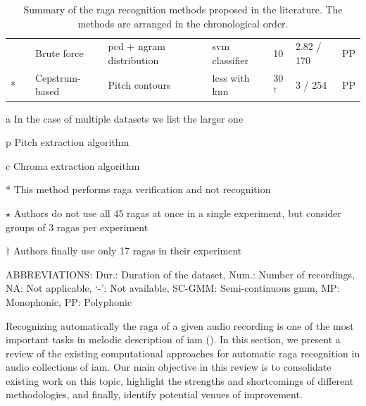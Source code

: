 \begin{table}
\begin{threeparttable}
\begin{centering}
\begin{tabular}{l l P{2cm} P{3cm} P{2.5cm} L{1cm} P{1.5cm} P{.75cm}}
				\cite{kumar2014identifying} & \cite{Salamon2012} & Brute force & \acrshort{pcd} + \acrshort{ngram} distribution & \acrshort{svm} classifier  & 10 & 2.82 / 170 & PP\tabularnewline
				\cite{shrey_ISMIR_2015}{*} & \cite{Salamon2012} & Cepstrum-based & Pitch contours & \acrshort{lcss} with \acrshort{knn} & 30{$^\dagger$} & 3 / 254 & PP\tabularnewline
				\hline 
			\end{tabular}
			\par \end{centering}
		\begin{tablenotes}
			\item[a] In the case of multiple datasets we list the larger one
			\item[p] Pitch extraction algorithm
			\item[c] Chroma extraction algorithm
			\item[*] This method performs \gls{raga} verification and not recognition
			\item[$\star$] Authors do not use all 45 \glspl{raga} at once in a single experiment, but consider groups of 3 \glspl{raga} per experiment
			\item[$\dagger$] Authors finally use only 17 \glspl{raga} in their experiment
			\\
			\item [] ABBREVIATIONS: Dur.: Duration of the dataset, Num.: Number of recordings, NA: Not applicable, `-': Not available, SC-GMM: Semi-continuous \acrshort{gmm}, MP: Monophonic, PP: Polyphonic
		\end{tablenotes}
		\caption[Summary of the existing \gls{raga} recognition methods]{Summary of the \Gls{raga} recognition methods proposed in the literature. The methods are arranged in the chronological order. }
		\label{tab:raga_recognition_methods_details}
	\end{threeparttable}
\end{table}

Recognizing automatically the \gls{raga} of a given audio recording is one of the most important tasks in melodic description of \gls{iam} (). In this section, we present a review of the existing computational approaches for automatic \gls{raga} recognition in audio collections of \gls{iam}. Our main objective in this review is to consolidate existing work on this topic, highlight the strengths and shortcomings of different methodologies, and finally, identify potential venues of improvement.

